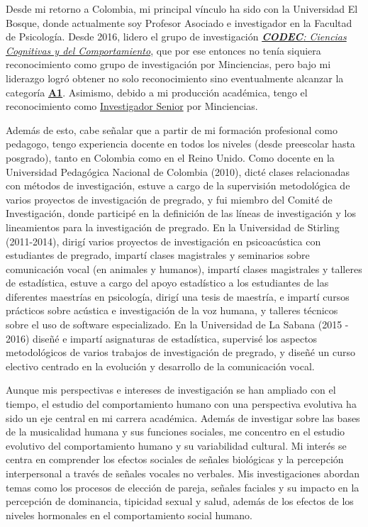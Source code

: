 \documentclass[11pt,a4paper,]{awesome-cv}
\begin{document}
\begin{small}
Desde mi retorno a Colombia, mi principal vínculo ha sido con la Universidad El Bosque, donde actualmente soy Profesor Asociado e investigador en la Facultad de Psicología. Desde 2016, lidero el grupo de investigación \href{https://unbosque.portalinvestigacion.com/grupos/302}{\textit{\textbf{CODEC}: Ciencias Cognitivas y del Comportamiento}}, que por ese entonces no tenía siquiera reconocimiento como grupo de investigación por Minciencias, pero bajo mi liderazgo logró obtener no solo reconocimiento sino eventualmente alcanzar la categoría \textbf{\href{https://scienti.minciencias.gov.co/gruplac/jsp/visualiza/visualizagr.jsp?nro=00000000001446}{A1}}. Asimismo, debido a mi producción académica, tengo el reconocimiento como \href{https://scienti.minciencias.gov.co/cvlac/visualizador/generarCurriculoCv.do?cod_rh=0001348945}{Investigador Senior} por Minciencias.

Además de esto, cabe señalar que a partir de mi formación profesional como pedagogo, tengo experiencia docente en todos los niveles (desde preescolar hasta posgrado), tanto en Colombia como en el Reino Unido. Como docente en la Universidad Pedagógica Nacional de Colombia (2010), dicté clases relacionadas con métodos de investigación, estuve a cargo de la supervisión metodológica de varios proyectos de investigación de pregrado, y fui miembro del Comité de Investigación, donde participé en la definición de las líneas de investigación y los lineamientos para la investigación de pregrado. En la Universidad de Stirling (2011-2014), dirigí varios proyectos de investigación en psicoacústica con estudiantes de pregrado, impartí clases magistrales y seminarios sobre comunicación vocal (en animales y humanos), impartí clases magistrales y talleres de estadística, estuve a cargo del apoyo estadístico a los estudiantes de las diferentes maestrías en psicología, dirigí una tesis de maestría, e impartí cursos prácticos sobre acústica e investigación de la voz humana, y talleres técnicos sobre el uso de software especializado. En la Universidad de La Sabana (2015 - 2016) diseñé e impartí asignaturas de estadística, supervisé los aspectos metodológicos de varios trabajos de investigación de pregrado, y diseñé un curso electivo centrado en la evolución y desarrollo de la comunicación vocal.

Aunque mis perspectivas e intereses de investigación se han ampliado con el tiempo, el estudio del comportamiento humano con una perspectiva evolutiva ha sido un eje central en mi carrera académica. Además de investigar sobre las bases de la musicalidad humana y sus funciones sociales, me concentro en el estudio evolutivo del comportamiento humano y su variabilidad cultural. Mi interés se centra en comprender los efectos sociales de señales biológicas y la percepción interpersonal a través de señales vocales no verbales. Mis investigaciones abordan temas como los procesos de elección de pareja, señales faciales y su impacto en la percepción de dominancia, tipicidad sexual y salud, además de los efectos de los niveles hormonales en el comportamiento social humano.


\end{small}
\end{document}
